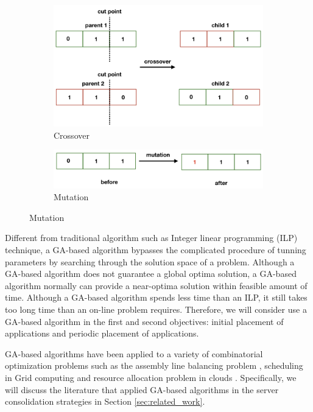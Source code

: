 \begin{figure}
	\centering
	\begin{subfigure}[b]{0.44\textwidth}
		\includegraphics[width=\textwidth]{pics/crossover.png}
	\caption{Crossover}
	\end{subfigure}
	\begin{subfigure}[b]{0.44\textwidth}
		\includegraphics[width=\textwidth]{pics/mutation.png}
	\caption{Mutation}
	\end{subfigure}
	\label{fig:operators}
\end{figure}

 Different from traditional algorithm such as Integer linear programming (ILP) technique, a GA-based algorithm bypasses the complicated procedure of tunning parameters by searching through the solution space of a problem. Although a GA-based algorithm does not guarantee a global optima solution, a GA-based algorithm normally can provide a near-optima solution within feasible amount of time. Although a GA-based algorithm spends less time than an ILP, it still takes too long time than an on-line problem requires. Therefore, we will consider use a GA-based algorithm in the first and second objectives: initial placement of applications and periodic placement of applications. 

GA-based algorithms have been applied to a variety of combinatorial optimization problems such as the assembly line balancing problem \cite{Anderson:1994io}, scheduling in Grid computing \cite{Zomaya:2005bb} and resource allocation problem in clouds \cite{Wilcox:2011ea}. Specifically, we will discuss the literature that applied GA-based algorithms in the server consolidation strategies in Section \ref{sec:related_work}. 

